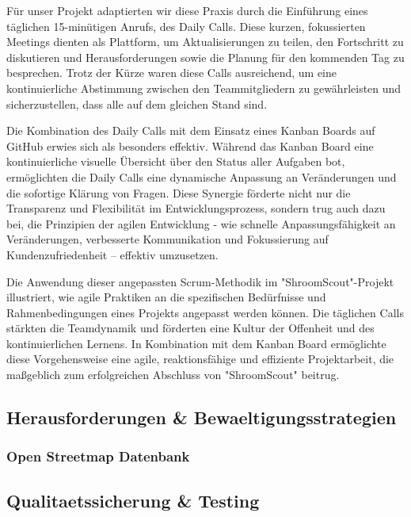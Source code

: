 \documentclass[../main.tex]{subfiles}
\begin{document}
Für unser Projekt adaptierten wir diese Praxis durch die Einführung eines täglichen 15-minütigen Anrufs, des Daily Calls. Diese kurzen, fokussierten Meetings 
dienten als Plattform, um Aktualisierungen zu teilen, den Fortschritt zu diskutieren und Herausforderungen sowie die Planung für den kommenden Tag zu besprechen. 
Trotz der Kürze waren diese Calls ausreichend, um eine kontinuierliche Abstimmung zwischen den Teammitgliedern zu gewährleisten und sicherzustellen, dass alle 
auf dem gleichen Stand sind.

Die Kombination des Daily Calls mit dem Einsatz eines Kanban Boards auf GitHub erwies sich als besonders effektiv. Während das Kanban Board eine kontinuierliche 
visuelle Übersicht über den Status aller Aufgaben bot, ermöglichten die Daily Calls eine dynamische Anpassung an Veränderungen und die sofortige Klärung von 
Fragen. Diese Synergie förderte nicht nur die Transparenz und Flexibilität im Entwicklungsprozess, sondern trug auch dazu bei, die Prinzipien der agilen Entwicklung 
- wie schnelle Anpassungsfähigkeit an Veränderungen, verbesserte Kommunikation und Fokussierung auf Kundenzufriedenheit – effektiv umzusetzen.

Die Anwendung dieser angepassten Scrum-Methodik im "ShroomScout"-Projekt illustriert, wie agile Praktiken an die spezifischen Bedürfnisse und Rahmenbedingungen 
eines Projekts angepasst werden können. Die täglichen Calls stärkten die Teamdynamik und förderten eine Kultur der Offenheit und des kontinuierlichen Lernens. 
In Kombination mit dem Kanban Board ermöglichte diese Vorgehensweise eine agile, reaktionsfähige und effiziente Projektarbeit, die maßgeblich zum erfolgreichen 
Abschluss von "ShroomScout" beitrug.

\subsection{Herausforderungen \& Bewaeltigungsstrategien} %
\subsubsection{Open Streetmap Datenbank}

\subsection{Qualitaetssicherung \& Testing} %
\end{document}

